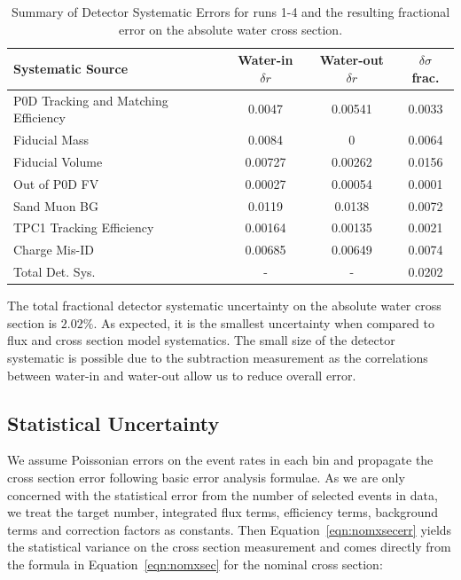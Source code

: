 \begin{table}[h]
\caption{Summary of Detector Systematic Errors for runs 1-4 and the resulting fractional error on the absolute water cross section.}
\centering
\begin{tabular}{lccc}\toprule\midrule
\renewcommand{\arraystretch}{1.1}
Systematic Source & Water-in $\delta r$  & Water-out $\delta r$ & $\delta\sigma$ frac.
\\ \midrule
P0D Tracking and Matching Efficiency & 0.0047 & 0.00541 & 0.0033\\
\midrule
Fiducial Mass & 0.0084 & 0 & 0.0064\\
\midrule
Fiducial Volume & 0.00727 & 0.00262 & 0.0156\\
\midrule
Out of P0D FV & 0.00027 & 0.00054 & 0.0001\\
\midrule
Sand Muon BG & 0.0119 & 0.0138 & 0.0072\\
\midrule
TPC1 Tracking Efficiency & 0.00164 & 0.00135 & 0.0021\\
\midrule
Charge Mis-ID & 0.00685  & 0.00649 & 0.0074\\
\midrule
\midrule
Total Det. Sys. &  - & - & 0.0202  \\
\midrule
\bottomrule
\end{tabular}
\label{tab:detsys}
\end{table}

The total fractional detector systematic uncertainty on the absolute water cross section is $2.02\%$. As expected, it is the smallest uncertainty when compared to flux and cross section model systematics. The small size of the detector systematic is possible due to the subtraction measurement as the correlations between water-in and water-out allow us to reduce overall error.

\clearpage

\subsection{Statistical Uncertainty}

We assume Poissonian errors on the event rates in each bin and propagate the cross section error following basic error analysis formulae. As we are only concerned with the statistical error from the number of selected events in data, we treat the target number, integrated flux terms, efficiency terms, background terms and correction factors as constants. Then Equation~\ref{eqn:nomxsecerr} yields the statistical variance on the cross section measurement and comes directly from the formula in Equation~\ref{eqn:nomxsec} for the nominal cross section:

